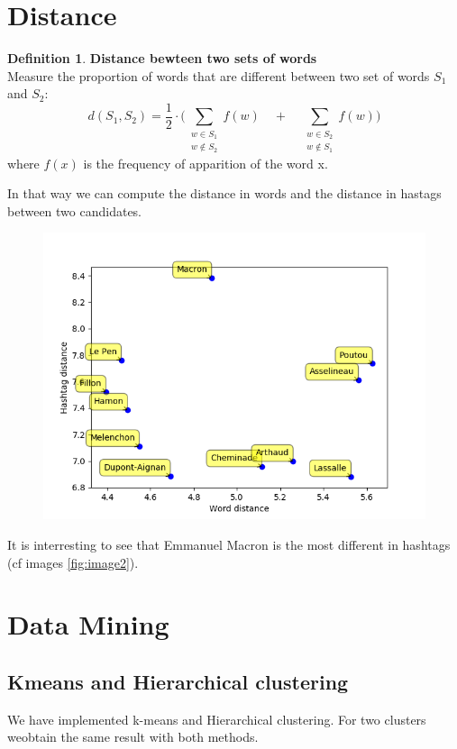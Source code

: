 \documentclass[a4paper]{article}
\theoremstyle{definition}
\newtheorem{definition}{Definition}[section]
\begin{document}
\newpage
\section{Distance}
\theoremstyle{definition}
\begin{definition}{\bf Distance bewteen two sets of words\\}
Measure the proportion of words that are different between two set of words $S_1$ and $S_2$:
\[
d(S_1, S_2)= \frac{1}{2} \cdot \Big( \sum_{\substack{w \in S_1\\w \notin S_2}}f(w) \quad + \quad \sum_{\substack{w \in S_2\\w \notin S_1}} f(w) \Big) 
\]
where $f(x)$ is the frequency of apparition of the word x.
\end{definition}

In that way we can compute the distance in words and the distance in hastags between two candidates.
\begin{figure}
\includegraphics[width=\textwidth]{distances.png}
\end{figure}

It is interresting to see that Emmanuel Macron is the most different in hashtags (cf images \ref{fig:image2}).

\newpage
\section{Data Mining}
\subsection{Kmeans and Hierarchical clustering}
We have implemented k-means and Hierarchical clustering.
For two clusters weobtain the same result with both methods.
\end{document}
